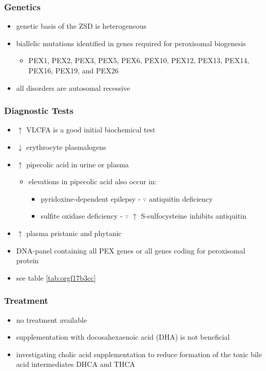 \documentclass[12pt]{scrartcl}
\begin{document}
\subsubsection{Genetics}
\label{sec:org29f9c3a}
\begin{itemize}
\item genetic basis of the ZSD is heterogeneous
\item biallelic mutations identified in genes required for peroxisomal biogenesis
\begin{itemize}
\item PEX1, PEX2, PEX3, PEX5, PEX6, PEX10, PEX12, PEX13, PEX14, PEX16, PEX19, and PEX26
\end{itemize}
\item all disorders are autosomal recessive
\end{itemize}

\subsubsection{Diagnostic Tests}
\label{sec:orgddb2030}
\begin{itemize}
\item \(\uparrow\) VLCFA is a good initial biochemical test
\item \(\downarrow\) erythrocyte plasmalogens
\item \(\uparrow\) pipecolic acid in urine or plasma
\begin{itemize}
\item elevations in pipecolic acid also occur in:
\begin{itemize}
\item pyridoxine-dependent epilepsy - \(\because\) antiquitin deficiency
\item sulfite oxidase deficiency - \(\because\) \(\uparrow\) S-sulfocysteine inhibits antiquitin
\end{itemize}
\end{itemize}
\item \(\uparrow\) plasma pristanic and phytanic
\item DNA-panel containing all PEX genes or all genes coding for
peroxisomal protein
\item see table \ref{tab:orgf17b3cc}
\end{itemize}
\subsubsection{Treatment}
\label{sec:orgd3e1835}
\begin{itemize}
\item no treatment available
\item supplementation with docosahexaenoic acid (DHA) is not beneficial
\item investigating cholic acid supplementation to reduce formation of the
toxic bile acid intermediates DHCA and THCA
\end{itemize}
\end{document}
